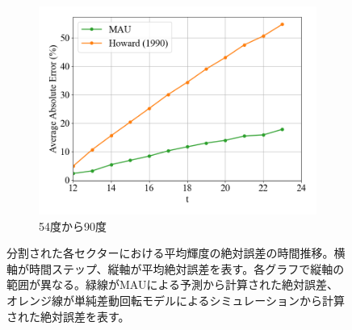 \begin{figure}[htbp]
\begin{subfigure}{0.5\textwidth}
              \includegraphics[width=\textwidth]{figures/exp1/lng_error_5.png}
              \caption{54度から90度}
            \end{subfigure}
            \caption{分割された各セクターにおける平均輝度の絶対誤差の時間推移。横軸が時間ステップ、縦軸が平均絶対誤差を表す。各グラフで縦軸の範囲が異なる。緑線がMAUによる予測から計算された絶対誤差、オレンジ線が単純差動回転モデルによるシミュレーションから計算された絶対誤差を表す。}
            \label{fig:lng_error}
          \end{figure}
          
